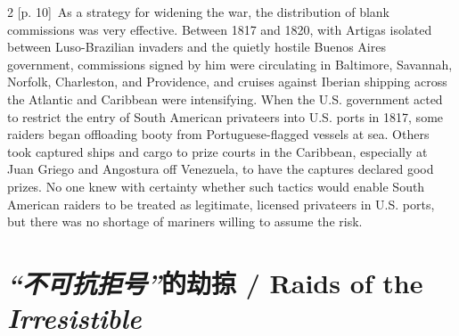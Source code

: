 \documentclass[10pt,a4paper]{article}
\begin{document}
\begin{paracol}{2}
\switchcolumn
{\scriptsize\color{gray} [p. 10]}\ As a strategy for widening the war, the distribution of blank commissions was very effective. Between 1817 and 1820, with Artigas isolated between Luso-Brazilian invaders and the quietly hostile Buenos Aires government, commissions signed by him were circulating in Baltimore, Savannah, Norfolk, Charleston, and Providence, and cruises against Iberian shipping across the Atlantic and Caribbean were intensifying. When the U.S. government acted to restrict the entry of South American privateers into U.S. ports in 1817, some raiders began offloading booty from Portuguese-flagged vessels at sea. Others took captured ships and cargo to prize courts in the Caribbean, especially at Juan Griego and Angostura off Venezuela, to have the captures declared good prizes. No one knew with certainty whether such tactics would enable South American raiders to be treated as legitimate, licensed privateers in U.S. ports, but there was no shortage of mariners willing to assume the risk.\par
\switchcolumn*
\end{paracol}
\section*{\textit{“不可抗拒号”}的劫掠 / Raids of the \textit{Irresistible}}
\end{document}
